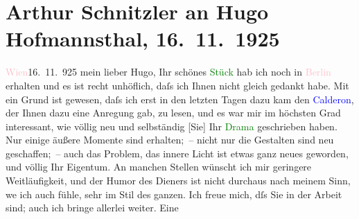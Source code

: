 

               \section[Arthur Schnitzler an Hugo Hofmannsthal, 16. 11. 1925]{ Arthur Schnitzler an Hugo Hofmannsthal, 16. 11. 1925}\nopagebreak{}\rehead{ }\normalsize\beginnumbering{} \toendnotes[C]{\smallbreak\pagebreak[2]} 
\toendnotes[C]{\smallbreak}\pstart
           \raggedleft{}{\pb}\textcolor{pink}{Wien}{}\ledrightnote{\textcolor{pink}{Wien}}{ }16. 11. 925\pend
           \pstart
           mein lieber Hugo, Ihr schönes \textcolor{green}{Stück}{}\ledrightnote{\textcolor{green}{Der Turm. Ein Trauerspiel}} hab ich noch in \textcolor{pink}{Berlin}{}\ledrightnote{\textcolor{pink}{Berlin}} erhalten
                    und es ist recht unhöflich, daſs ich Ihnen nicht gleich gedankt habe. Mit ein
                    Grund ist gewesen, daſs ich erst in den letzten Tagen \introOben{}dazu
                        kam\introOben{} den \textcolor{green}{\textcolor{blue}{Calderon}{}\ledrightnote{\textcolor{blue}{Pedro Calderón de la Barca}}}{}, der Ihnen dazu eine Anregung gab, zu lesen, und es war mir im höchsten
                    Grad interessant, wie völlig neu und selbständig {[}Sie{]} Ihr
                        \textcolor{green}{Drama}{} geschrieben haben.
                    Nur einige äußere Momente sind erhalten; – nicht nur die Gestalten sind neu
                    geschaffen; – auch das Problem, das innere Licht ist etwas ganz neues geworden,
                    und völlig Ihr Eigentum. An manchen Stellen wünscht ich mir geringere
                    Weitläufigkeit, und der Humor des Dieners ist nicht durchaus nach meinem Sinn,
                        we{\geminationn} ich auch fühle, sehr im Stil des
                    ganzen.\pend
           \pstart
           Ich freue mich, dſs Sie in der Arbeit sind; auch ich bringe allerlei weiter. Eine
